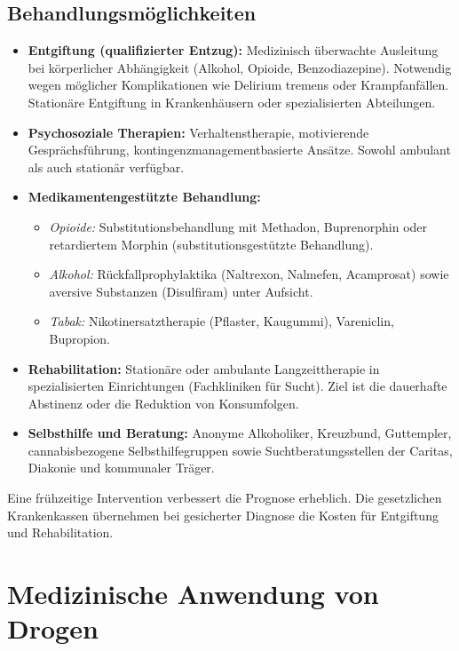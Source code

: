 \documentclass[11pt,a4paper]{article}
\begin{document}
	\subsection{Behandlungsmöglichkeiten}
	\begin{itemize}[leftmargin=*, noitemsep]
		\item \textbf{Entgiftung (qualifizierter Entzug):} Medizinisch überwachte Ausleitung bei körperlicher Abhängigkeit (Alkohol, Opioide, Benzodiazepine). Notwendig wegen möglicher Komplikationen wie Delirium tremens oder Krampfanfällen. Stationäre Entgiftung in Krankenhäusern oder spezialisierten Abteilungen.
		\item \textbf{Psychosoziale Therapien:} Verhaltenstherapie, motivierende Gesprächsführung, kontingenzmanagementbasierte Ansätze. Sowohl ambulant als auch stationär verfügbar.
		\item \textbf{Medikamentengestützte Behandlung:} 
		\begin{itemize}
			\item \textit{Opioide:} Substitutionsbehandlung mit Methadon, Buprenorphin oder retardiertem Morphin (substitutionsgestützte Behandlung).
			\item \textit{Alkohol:} Rückfallprophylaktika (Naltrexon, Nalmefen, Acamprosat) sowie aversive Substanzen (Disulfiram) unter Aufsicht.
			\item \textit{Tabak:} Nikotinersatztherapie (Pflaster, Kaugummi), Vareniclin, Bupropion.
		\end{itemize}
		\item \textbf{Rehabilitation:} Stationäre oder ambulante Langzeittherapie in spezialisierten Einrichtungen (Fachkliniken für Sucht). Ziel ist die dauerhafte Abstinenz oder die Reduktion von Konsumfolgen.
		\item \textbf{Selbsthilfe und Beratung:} Anonyme Alkoholiker, Kreuzbund, Guttempler, cannabisbezogene Selbsthilfegruppen sowie Suchtberatungsstellen der Caritas, Diakonie und kommunaler Träger.
	\end{itemize}
	
	Eine frühzeitige Intervention verbessert die Prognose erheblich. Die gesetzlichen Krankenkassen übernehmen bei gesicherter Diagnose die Kosten für Entgiftung und Rehabilitation\cite{dhs-behandlung}.
	
	\section{Medizinische Anwendung von Drogen}
	
\end{document}
